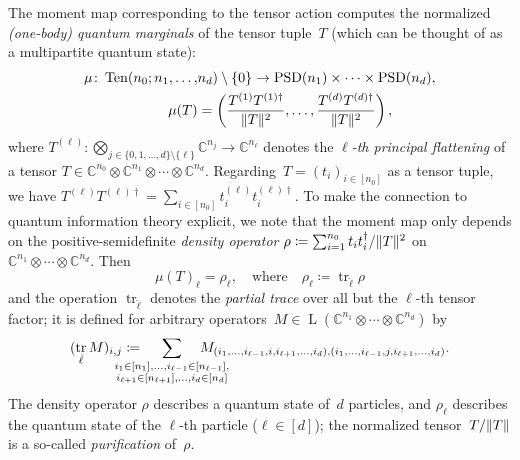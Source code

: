 \documentclass[11pt,letterpaper]{article}
\numberwithin{equation}{section}
\newcommand{\ot}{\otimes}
\newcommand{\CC}{\mathbb{C}}
\DeclareMathOperator{\PSD}{PSD}
\DeclareMathOperator{\Lin}{L}
\DeclareMathOperator{\tr}{tr}
\DeclareMathOperator{\Ten}{Ten}
\DeclarePairedDelimiter\norm{\lVert}{\rVert}
\begin{document}
The moment map corresponding to the tensor action computes the normalized \emph{(one-body) quantum marginals} of the tensor tuple~$T$ (which can be thought of as a multipartite quantum state):
\begin{equation}\label{eq:momentmap_tensor}
\begin{aligned}
    \mu \colon \Ten(n_0;n_1, \ldots, &n_d)\setminus\{0\} \to \PSD(n_1) \times\cdots\times\PSD(n_d), \\
    \mu(T) &= \left( \frac{T^{(1)}T^{(1)\dagger}}{\norm{T}^2}, \ldots, \frac{T^{(d)}T^{(d)\dagger}}{\norm{T}^2} \right),
\end{aligned}
\end{equation}
where $T^{(\ell)} \colon \bigotimes_{j\in \{0, 1, \ldots, d\}\setminus\{\ell\}}\CC^{n_j} \to \CC^{n_\ell}$ denotes the \emph{$\ell$-th principal flattening} of a tensor $T \in \CC^{n_0} \ot \CC^{n_1} \ot \cdots \ot \CC^{n_d}$.
Regarding~$T=(t_i)_{i \in [n_0]}$ as a tensor tuple, we have $T^{(\ell)}T^{(\ell)\dagger} = \sum_{i\in [n_0]}t_i^{(\ell)}t_i^{(\ell)\dagger}$.
To make the connection to quantum information theory explicit, we note that the moment map only depends on the positive-semidefinite \emph{density operator} $\rho \coloneqq \sum_{i=1}^{n_0} t_i t_i^\dagger / \norm T^2$ on~$\CC^{n_1} \ot \cdots \ot \CC^{n_d}$.
Then
\begin{equation}\label{eq:moment map vs partial trace}
    \mu(T)_\ell = \rho_\ell,
\quad\text{where}\quad \rho_\ell \coloneqq \tr_{\check\ell}\rho
\end{equation}
and the operation $\tr_{\check\ell}$ denotes the \emph{partial trace} over all but the $\ell$-th tensor factor; it is defined for arbitrary operators~$M \in \Lin(\CC^{n_1} \ot \cdots \ot \CC^{n_d})$ by
\begin{align}\label{eq:partial trace}
(\tr_{\check\ell}M)_{i,j} \coloneqq
\qquad\mathclap{\sum_{\substack{i_1\in[n_1],\dots,i_{\ell-1}\in[n_{\ell-1}],\\i_{\ell+1}\in[n_{\ell+1}],\dots,i_d\in[n_d]}}}\qquad
M_{(i_1,\dots,i_{\ell-1},i,i_{\ell+1},\dots,i_d),(i_1,\dots,i_{\ell-1},j,i_{\ell+1},\dots,i_d)}.
\end{align}
The density operator $\rho$ describes a quantum state of~$d$ particles, and $\rho_\ell$ describes the quantum state of the $\ell$-th particle ($\ell\in[d]$);
the normalized tensor~$T/\norm T$ is a so-called \emph{purification} of~$\rho$.
\end{document}
